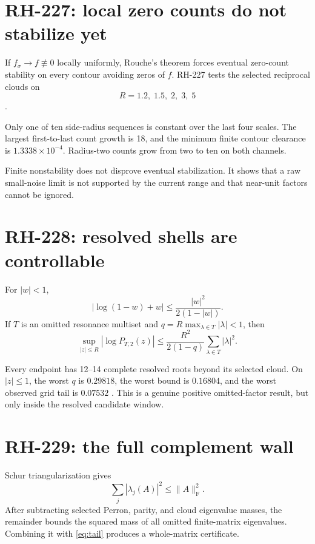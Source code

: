\documentclass[11pt]{article}
\theoremstyle{remark}\newtheorem{remark}[theorem]{Remark}
\begin{document}
\section{RH-227: local zero counts do not stabilize yet}

If $f_\sigma\to f\not\equiv0$ locally uniformly, Rouche's theorem forces
eventual zero-count stability on every contour avoiding zeros of $f$.
RH-227 tests the selected reciprocal clouds on
\[
 R=1.2,\;1.5,\;2,\;3,\;5
\]
\citep{WangRH227}.

Only one of ten side-radius sequences is constant over the last four scales.
The largest first-to-last count growth is 18, and the minimum finite contour
clearance is $1.3338\times10^{-4}$. Radius-two counts grow from two to ten on
both channels.

Finite nonstability does not disprove eventual stabilization. It shows that a
raw small-noise limit is not supported by the current range and that
near-unit factors cannot be ignored.

\section{RH-228: resolved shells are controllable}

For $|w|<1$,
\[
 |\log(1-w)+w|
 \le\frac{|w|^2}{2(1-|w|)}.
\]
If $T$ is an omitted resonance multiset and
$q=R\max_{\lambda\in T}|\lambda|<1$, then
\begin{equation}\label{eq:tail}
 \sup_{|z|\le R}
 \left|\log P_{T,2}(z)\right|
 \le\frac{R^2}{2(1-q)}
 \sum_{\lambda\in T}|\lambda|^2.
\end{equation}

Every endpoint has 12--14 complete resolved roots beyond its selected cloud.
On $|z|\le1$, the worst $q$ is $0.29818$, the worst bound is $0.16804$, and
the worst observed grid tail is $0.07532$ \citep{WangRH228}. This is a genuine
positive omitted-factor result, but only inside the resolved candidate
window.

\section{RH-229: the full complement wall}

Schur triangularization gives
\[
 \sum_j|\lambda_j(A)|^2\le\|A\|_{\mathrm F}^2.
\]
After subtracting selected Perron, parity, and cloud eigenvalue masses, the
remainder bounds the squared mass of all omitted finite-matrix eigenvalues.
Combining it with \eqref{eq:tail} produces a whole-matrix certificate.
\end{document}
